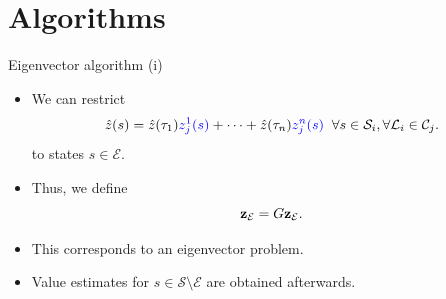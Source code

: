 \documentclass{beamer}
\theoremstyle{mystyle}
\newcommand{\cC}{\mathcal{C}}
\newcommand{\cE}{\mathcal{E}}
\newcommand{\cL}{\mathcal{L}}
\newcommand{\cS}{\mathcal{S}}
\newcommand{\cT}{\mathcal{T}}
\begin{document}
\section{Algorithms}

\begin{frame}{Eigenvector algorithm (i)}
\begin{itemize}
    \item We can restrict
    \begin{equation*}
        \hat{z}(s)=\hat{z}(\tau_1) {\color{blue} z_j^1(s)}+\cdots+\hat{z}(\tau_n){\color{blue}z_j^n(s)} \;\; \forall s\in\cS_i,\forall\cL_i\in\cC_j.
    \end{equation*}
    to states $s \in \cE$.
    \item Thus, we define 
    \begin{equation*}\label{eq:exits}
     {\bf z}_\cE=G{\bf z}_\cE.
    \end{equation*}
    \item This corresponds to an eigenvector problem.
    \item Value estimates for $s \in \cS \setminus \cE$ are obtained afterwards.
\end{itemize}
    
\end{frame}

%
%
%    
%
%
\end{document}
